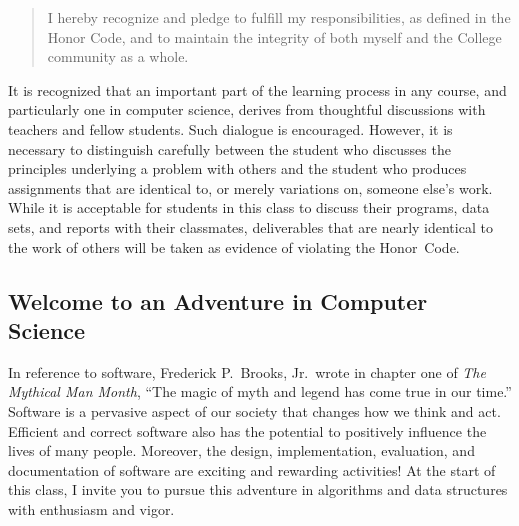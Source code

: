 \begin{quote}
  I hereby recognize and pledge to fulfill my responsibilities, as defined in the Honor Code, and to maintain the
  integrity of both myself and the College community as a whole.
\end{quote}

\noindent It is recognized that an important part of the learning process in any course, and particularly one in
computer science, derives from thoughtful discussions with teachers and fellow students. Such dialogue is encouraged.
However, it is necessary to distinguish carefully between the student who discusses the principles underlying a problem
with others and the student who produces assignments that are identical to, or merely variations on, someone else's
work.  While it is acceptable for students in this class to discuss their programs, data sets, and reports with their
classmates, deliverables that are nearly identical to the work of others will be taken as evidence of violating the
\mbox{Honor Code}.

\subsection*{Welcome to an Adventure in Computer Science}

In reference to software, Frederick P.\ Brooks, Jr.\ wrote in chapter one of {\em The Mythical Man Month}, ``The magic
of myth and legend has come true in our time.'' Software is a pervasive aspect of our society that changes how we think
and act. Efficient and correct software also has the potential to positively influence the lives of many people.
Moreover, the design, implementation, evaluation, and documentation of software are exciting and rewarding activities!
At the start of this class, I invite you to pursue this adventure in algorithms and data structures with enthusiasm and
vigor.


